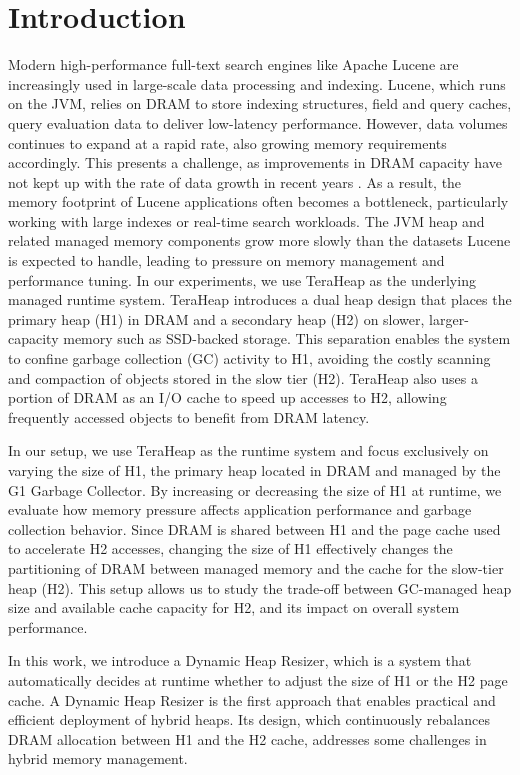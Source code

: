 \section{Introduction}
Modern high-performance full-text search engines like Apache Lucene \cite{lucene_dimitris} are increasingly used in large-scale data processing and indexing. Lucene, which runs on the JVM, relies on DRAM to store indexing structures, field and query caches, query evaluation data to deliver low-latency performance. However, data volumes continues to expand at a rapid rate, also growing memory requirements accordingly. This presents a challenge, as improvements in DRAM capacity have not kept up with the rate of data growth in recent years \cite{DAOS, Borg}. As a result, the memory footprint of Lucene applications often becomes a bottleneck, particularly working with large indexes or real-time search workloads. The JVM heap and related managed memory components grow more slowly than the datasets Lucene is expected to handle, leading to pressure on memory management and performance tuning. In our experiments, we use TeraHeap as the underlying managed runtime system. TeraHeap introduces a dual heap design that places the primary heap (H1) in DRAM and a secondary heap (H2) on slower, larger-capacity memory such as SSD-backed storage. This separation enables the system to confine garbage collection (GC) activity to H1, avoiding the costly scanning and compaction of objects stored in the slow tier (H2). TeraHeap also uses a portion of DRAM as an I/O cache to speed up accesses to H2, allowing frequently accessed objects to benefit from DRAM latency.

In our setup, we use TeraHeap \cite{TeraHeap} as the runtime system and focus exclusively on varying the size of H1, the primary heap located in DRAM and managed by the G1 Garbage Collector. By increasing or decreasing the size of H1 at runtime, we evaluate how memory pressure affects application performance and garbage collection behavior. Since DRAM is shared between H1 and the page cache used to accelerate H2 accesses, changing the size of H1 effectively changes the partitioning of DRAM between managed memory and the cache for the slow-tier heap (H2). This setup allows us to study the trade-off between GC-managed heap size and available cache capacity for H2, and its impact on overall system performance.

In this work, we introduce a Dynamic Heap Resizer, which is a system that automatically decides at runtime whether to adjust the size of H1 or the H2 page cache. A Dynamic Heap Resizer is the first approach that enables practical and efficient deployment of hybrid heaps. Its design, which continuously rebalances DRAM allocation between H1 and the H2 cache, addresses some challenges in hybrid memory management.

